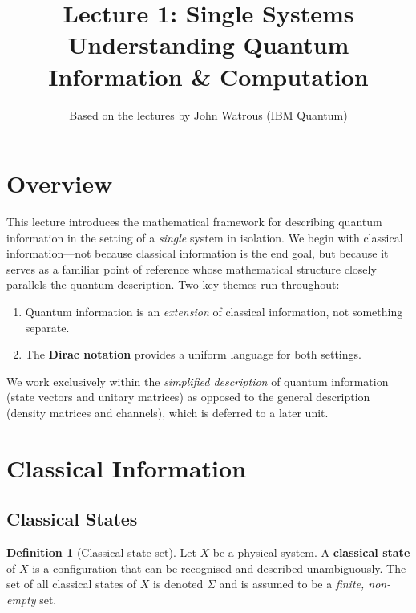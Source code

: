 \documentclass[11pt]{article}
\title{\textbf{Lecture 1: Single Systems} \\ \large Understanding Quantum Information \& Computation}
\author{Based on the lectures by John Watrous (IBM Quantum)}
\date{}
\theoremstyle{definition}
\newtheorem{definition}{Definition}[section]
\begin{document}
\maketitle
\tableofcontents
\newpage

\section{Overview}

This lecture introduces the mathematical framework for describing quantum information in the setting of a \emph{single} system in isolation.  We begin with classical information---not because classical information is the end goal, but because it serves as a familiar point of reference whose mathematical structure closely parallels the quantum description.  Two key themes run throughout:

\begin{enumerate}[label=(\roman*)]
    \item Quantum information is an \emph{extension} of classical information, not something separate.
    \item The \textbf{Dirac notation} provides a uniform language for both settings.
\end{enumerate}

We work exclusively within the \emph{simplified description} of quantum information (state vectors and unitary matrices) as opposed to the general description (density matrices and channels), which is deferred to a later unit.

\section{Classical Information}

\subsection{Classical States}

\begin{definition}[Classical state set]
Let $X$ be a physical system.  A \textbf{classical state} of $X$ is a configuration that can be recognised and described unambiguously.  The set of all classical states of $X$ is denoted $\Sigma$ and is assumed to be a \emph{finite, non-empty} set.
\end{definition}
\end{document}
